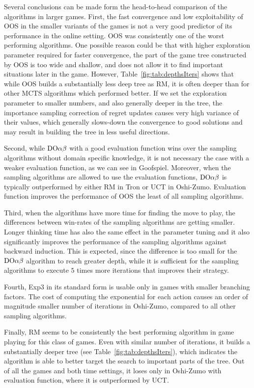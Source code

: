 Several conclusions can be made form the head-to-head comparison of the algorithms in larger games.
First, the fast convergence and low exploitability of OOS in the smaller variants of the games is not a very good predictor of its performance in the online setting. OOS was consistently one of the worst performing algorithms. One possible reason could be that with higher exploration parameter required for faster convergence, the part of the game tree constructed by OOS is too wide and shallow, and does not allow it to find important situations later in the game. However, Table~\ref{fig:tab:depthsIters} shows that while OOS builds a substantially less deep tree as RM, it is often deeper than for other MCTS algorithms which performed better. If we set the exploration parameter to smaller numbers, and also generally deeper in the tree, the importance sampling correction of regret updates causes very high variance of their values, which generally slows-down the convergence to good solutions and may result in building the tree in less useful directions.

Second, while $\textrm{DO}\alpha\beta$ with a good evaluation function wins over the sampling algorithms without domain specific knowledge, it is not necessary the case with a weaker evaluation function, as we can see in Goofspiel. Moreover, when the sampling algorithms are allowed to use the evaluation functions, $\textrm{DO}\alpha\beta$ is typically outperformed by either RM in Tron or UCT in Oshi-Zumo.
Evaluation function improves the performance of OOS the least of all sampling algorithms. 

Third, when the algorithms have more time for finding the move to play, the differences between win-rates of the sampling algorithms are getting smaller. Longer thinking time has also the same effect in the parameter tuning and it also significantly improves the performance of the sampling algorithms against backward induction. This is expected, since the difference is too small for the $\textrm{DO}\alpha\beta$ algorithm to reach greater depth, while it is sufficient for the sampling algorithms to execute $5$ times more iterations that improves their strategy.

Fourth, Exp3 in its standard form is usable only in games with smaller branching factors. The cost of computing the exponential for each action causes an order of magnitude smaller number of iterations in Oshi-Zumo, compared to all other sampling algorithms.

Finally, RM seems to be consistently the best performing algorithm in game playing for this class of games. Even with similar number of iterations, it builds a substantially deeper tree (see Table~\ref{fig:tab:depthsIters}), which indicates the algorithm is able to better target the search to important parts of the tree. Out of all the games and both time settings, it loses only in Oshi-Zumo with evaluation function, where it is outperformed by UCT.

